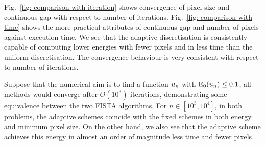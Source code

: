\documentclass[smallextended]{svjour3}
\newcommand{\op}[1]{\operatorname{#1}}
\newcommand{\1}{\F{1}}
\newcommand*{\var}[1]{%
	\IfEqCase{#1}{%
		{0}{u}%
		{1}{v}%
		{2}{w}%
	}[u#1]%
}
\begin{document}
	Fig.~\ref{fig: comparison with iteration} shows convergence of pixel size and continuous gap with respect to number of iterations. Fig.~\ref{fig: comparison with time} shows the more practical attributes of continuous gap and number of pixels against execution time. We see that the adaptive discretisation is consistently capable of computing lower energies with fewer pixels and in less time than the uniform discretisation. The convergence behaviour is very consistent with respect to number of iterations.
	
	Suppose that the numerical aim is to find a function $\var0_n$ with $\op{E}_0(\var0_n)\leq 0.1$, all methods would converge after $O(10^3)$ iterations, demonstrating some equivalence between the two FISTA algorithms. For $n\in[10^3,10^4]$, in both problems, the adaptive schemes coincide with the fixed schemes in both energy and minimum pixel size. On the other hand, we also see that the adaptive scheme achieves this energy in almost an order of magnitude less time and fewer pixels.
	
\end{document}
